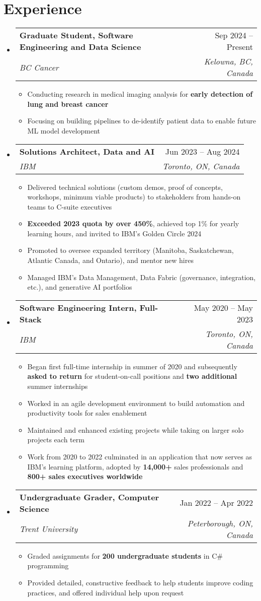 \documentclass[letterpaper,11.5pt]{article}
\makeatletter
\newcommand{\resumeItem}[1]{
  \item\small{
    {#1 \vspace{-2pt}}
  }
}
\newcommand{\resumeSubheading}[4]{
  \vspace{-2pt}\item
    \begin{tabular*}{0.97\textwidth}[t]{l@{\extracolsep{\fill}}r}
      \textbf{#1} & #2 \\
      \textit{\small#3} & \textit{\small #4} \\
    \end{tabular*}\vspace{-7pt}
}
\newcommand{\resumeSubHeadingListStart}{\begin{itemize}[leftmargin=0.15in, label={}]}
\newcommand{\resumeSubHeadingListEnd}{\end{itemize}}
\newcommand{\resumeItemListStart}{\begin{itemize}}
\newcommand{\resumeItemListEnd}{\end{itemize}\vspace{-5pt}}
\makeatother
\begin{document}
\section{Experience}
  \resumeSubHeadingListStart
    \resumeSubheading
      {Graduate Student, Software Engineering and Data Science}{Sep 2024 -- Present}
      {BC Cancer}{Kelowna, BC, Canada}
      \resumeItemListStart
        \resumeItem{Conducting research in medical imaging analysis for \textbf{early detection of lung and breast cancer}}
        \resumeItem{Focusing on building pipelines to de-identify patient data to enable future ML model development}
      \resumeItemListEnd
    \resumeSubheading
      {Solutions Architect, Data and AI}{Jun 2023 -- Aug 2024}
      {IBM}{Toronto, ON, Canada}
      \resumeItemListStart
        \resumeItem{Delivered technical solutions (custom demos, proof of concepts, workshops, minimum viable products) to stakeholders from hands-on teams to C-suite executives}
        \resumeItem{\textbf{Exceeded 2023 quota by over 450\%}, achieved top 1\% for yearly learning hours, and invited to IBM's Golden Circle 2024}
        \resumeItem{Promoted to oversee expanded territory (Manitoba, Saskatchewan, Atlantic Canada, and Ontario), and mentor new hires}
        \resumeItem{Managed IBM's Data Management, Data Fabric (governance, integration, etc.), and generative AI portfolios}
      \resumeItemListEnd
    \resumeSubheading
      {Software Engineering Intern, Full-Stack}{May 2020 -- May 2023}
      {IBM}{Toronto, ON, Canada}
      \resumeItemListStart
        \resumeItem{Began first full-time internship in summer of 2020 and subsequently \textbf{asked to return} for student-on-call positions and \textbf{two additional} summer internships}
        \resumeItem{Worked in an agile development environment to build automation and productivity tools for sales enablement}
        \resumeItem{Maintained and enhanced existing projects while taking on larger solo projects each term}
        \resumeItem{Work from 2020 to 2022 culminated in an application that now serves as IBM's learning platform, adopted by \textbf{14,000+} sales professionals and \textbf{800+ sales executives worldwide}}
      \resumeItemListEnd
      \resumeSubheading
      {Undergraduate Grader, Computer Science}{Jan 2022 -- Apr 2022}
      {Trent University}{Peterborough, ON, Canada}
      \resumeItemListStart
        \resumeItem{Graded assignments for \textbf{200 undergraduate students} in C\# programming}
        \resumeItem{Provided detailed, constructive feedback to help students improve coding practices, and offered individual help upon request}
      \resumeItemListEnd
  \resumeSubHeadingListEnd
\end{document}
